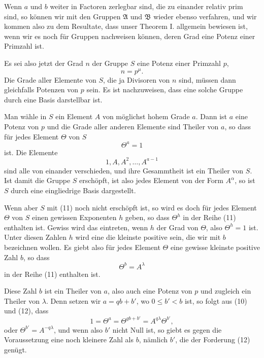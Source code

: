 \documentclass[11pt]{article}
\begin{document}
Wenn $a$ und $b$ weiter in Factoren zerlegbar sind, die zu einander relativ prim sind, so können wir mit den Gruppen $\mathfrak A$ und $\mathfrak B$ wieder ebenso verfahren, und wir kommen also zu dem Resultate, dass unser Theorem I. allgemein bewiesen ist, wenn wir es noch für Gruppen nachweisen können, deren Grad eine Potenz einer Primzahl ist.

Es sei also jetzt der Grad $n$ der Gruppe $S$ eine Potenz einer Primzahl $p$,
\begin{equation}
n=p^\mu.
\tag{9}
\end{equation}
Die Grade aller Elemente von $S$, die ja Divisoren von $n$ sind, müssen dann gleichfalls Potenzen von $p$ sein. Es ist nachzuweisen, dass eine solche Gruppe durch eine Basis darstellbar ist.

Man wähle in $S$ ein Element $A$ von möglichst hohem Grade $a$. Dann ist $a$ eine Potenz von $p$ und die Grade aller anderen Elemente sind Theiler von $a$, so dass für jedes Element $\Theta$ von $S$
\begin{equation}
\Theta^a=1
\tag{10}
\end{equation}
ist. Die Elemente
\begin{equation}
1,A,A^2,\ldots,A^{a-1}
\tag{11}
\end{equation}
sind alle von einander verschieden, und ihre Gesammtheit ist ein Theiler von $S$. Ist damit die Gruppe $S$ erschöpft, ist also jedes Element von der Form $A^\alpha$, so ist $S$ durch eine eingliedrige Basis dargestellt.

Wenn aber $S$ mit (11) noch nicht erschöpft ist, so wird es doch für jedes Element $\Theta$ von $S$ einen gewissen Exponenten $h$ geben, so dass $\Theta^h$ in der Reihe (11) enthalten ist. Gewiss wird das eintreten, wenn $h$ der Grad von $\Theta$, also $\Theta^h=1$ ist. Unter diesen Zahlen $h$ wird eine die kleinste positive sein, die wir mit $b$ bezeichnen wollen. Es giebt also für jedes Element $\Theta$ eine gewisse kleinste positive Zahl $b$, so dass
\begin{equation}
\Theta^b=A^\lambda
\tag{12}
\end{equation}
in der Reihe (11) enthalten ist.

Diese Zahl $b$ ist ein Theiler von $a$, also auch eine Potenz von $p$ und zugleich ein Theiler von $\lambda$. Denn setzen wir $a=qb+b'$, wo $0\le b'<b$ ist, so folgt aus (10) und (12), dass
\[
1=\Theta^a=\Theta^{qb+b'}=A^{q\lambda}\Theta^{b'},
\]
oder $\Theta^{b'}=A^{-q\lambda}$, und wenn also $b'$ nicht Null ist, so giebt es gegen die Voraussetzung eine noch kleinere Zahl als $b$, nämlich $b'$, die der Forderung (12) genügt.
\end{document}
